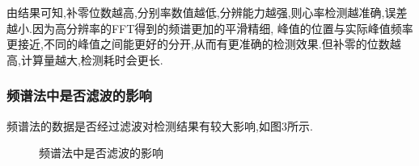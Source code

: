 \documentclass[12pt, a4paper, oneside]{ctexart}
\begin{document}
    由结果可知,补零位数越高,分别率数值越低,分辨能力越强,则心率检测越准确,误差越小.因为高分辨率的FFT得到的频谱更加的平滑精细,
    峰值的位置与实际峰值频率更接近,不同的峰值之间能更好的分开,从而有更准确的检测效果.但补零的位数越高,计算量越大,检测耗时会更长.

      \subsubsection{频谱法中是否滤波的影响}
    频谱法的数据是否经过滤波对检测结果有较大影响,如图3所示.
      \begin{figure}[H]
        \centering
        \caption{频谱法中是否滤波的影响}
        \label{fig:twopicture} 
      \end{figure}
      
\end{document}
